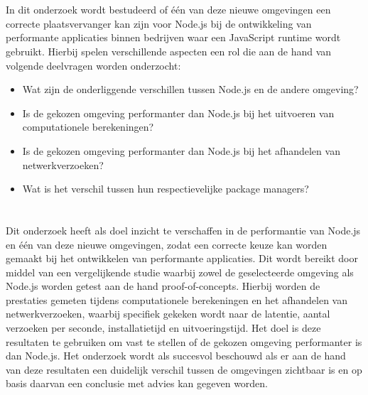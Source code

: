 \section{}%
\label{sec:onderzoeksvraag}

In dit onderzoek wordt bestudeerd of één van deze nieuwe omgevingen
een correcte plaatsvervanger kan zijn voor Node.js bij de ontwikkeling van performante applicaties binnen bedrijven 
waar een JavaScript runtime wordt gebruikt.
Hierbij spelen verschillende aspecten een rol die aan de hand van volgende deelvragen worden onderzocht:
\begin{itemize}
  \item Wat zijn de onderliggende verschillen tussen Node.js en de andere omgeving?
  \item Is de gekozen omgeving performanter dan Node.js bij het uitvoeren van computationele berekeningen?
  \item Is de gekozen omgeving performanter dan Node.js bij het afhandelen van netwerkverzoeken?
  \item Wat is het verschil tussen hun respectievelijke package managers?
\end{itemize}

\section{}%
\label{sec:onderzoeksdoelstelling}

Dit onderzoek heeft als doel inzicht te verschaffen in de performantie van Node.js en één van deze nieuwe omgevingen,
zodat een correcte keuze kan worden gemaakt bij het ontwikkelen van performante applicaties. Dit wordt bereikt door middel van een vergelijkende studie
waarbij zowel de geselecteerde omgeving als Node.js worden getest aan de hand proof-of-concepts. 
Hierbij worden de prestaties gemeten tijdens computationele berekeningen en het afhandelen van netwerkverzoeken, waarbij specifiek gekeken wordt naar
de latentie, aantal verzoeken per seconde, installatietijd en uitvoeringstijd. 
Het doel is deze resultaten te gebruiken om vast te stellen of de gekozen omgeving performanter is dan Node.js. 
Het onderzoek wordt als succesvol beschouwd als er aan de hand van deze resultaten een duidelijk verschil tussen de omgevingen zichtbaar is 
en op basis daarvan een conclusie met advies kan gegeven worden.
\section{}%
\label{sec:opzet-bachelorproef}

